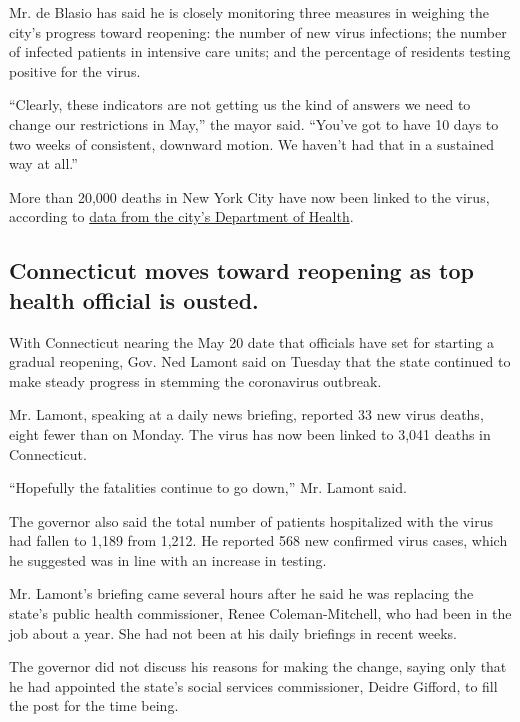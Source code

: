 Mr. de Blasio has said he is closely monitoring three measures in
weighing the city's progress toward reopening: the number of new virus
infections; the number of infected patients in intensive care units; and
the percentage of residents testing positive for the virus.

``Clearly, these indicators are not getting us the kind of answers we
need to change our restrictions in May,'' the mayor said. ``You've got
to have 10 days to two weeks of consistent, downward motion. We haven't
had that in a sustained way at all.''

More than 20,000 deaths in New York City have now been linked to the
virus, according to
\href{https://www1.nyc.gov/site/doh/covid/covid-19-data.page}{data from
the city's Department of Health}.

\hypertarget{connecticut-moves-toward-reopening-as-top-health-official-is-ousted}{%
\subsection{Connecticut moves toward reopening as top health official is
ousted.}\label{connecticut-moves-toward-reopening-as-top-health-official-is-ousted}}

With Connecticut nearing the May 20 date that officials have set for
starting a gradual reopening, Gov. Ned Lamont said on Tuesday that the
state continued to make steady progress in stemming the coronavirus
outbreak.

Mr. Lamont, speaking at a daily news briefing, reported 33 new virus
deaths, eight fewer than on Monday. The virus has now been linked to
3,041 deaths in Connecticut.

``Hopefully the fatalities continue to go down,'' Mr. Lamont said.

The governor also said the total number of patients hospitalized with
the virus had fallen to 1,189 from 1,212. He reported 568 new confirmed
virus cases, which he suggested was in line with an increase in testing.

Mr. Lamont's briefing came several hours after he said he was replacing
the state's public health commissioner, Renee Coleman-Mitchell, who had
been in the job about a year. She had not been at his daily briefings in
recent weeks.

The governor did not discuss his reasons for making the change, saying
only that he had appointed the state's social services commissioner,
Deidre Gifford, to fill the post for the time being.

